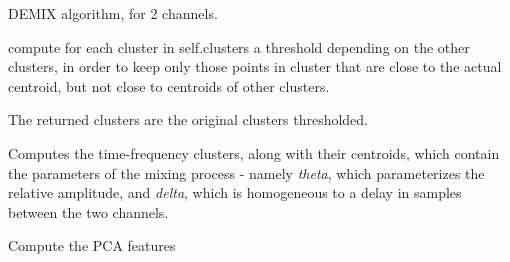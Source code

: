 \documentclass[letterpaper,10pt,english]{sphinxmanual}
\begin{document}
\begin{fulllineitems}
\label{reference/demix:pyfasst.demixTF.DEMIX}
DEMIX algorithm, for 2 channels.

\begin{fulllineitems}
\label{reference/demix:pyfasst.demixTF.DEMIX.adaptive_thresholding_clusters}
compute for each cluster in self.clusters a threshold depending
on the other clusters, in order to keep only those points in cluster
that are close to the actual centroid, but not close to centroids of
other clusters.

The returned clusters are the original clusters thresholded.

\end{fulllineitems}


\begin{fulllineitems}
\label{reference/demix:pyfasst.demixTF.DEMIX.comp_clusters}
Computes the time-frequency clusters, along with their centroids,
which contain the parameters of the mixing process - namely \emph{theta},
which parameterizes the relative amplitude, and \emph{delta}, which is
homogeneous to a delay in samples between the two channels.

\end{fulllineitems}


\begin{fulllineitems}
\label{reference/demix:pyfasst.demixTF.DEMIX.comp_parameters}
\end{fulllineitems}


\begin{fulllineitems}
\label{reference/demix:pyfasst.demixTF.DEMIX.comp_pcafeatures}
Compute the PCA features


\end{fulllineitems}
\end{fulllineitems}
\end{document}
